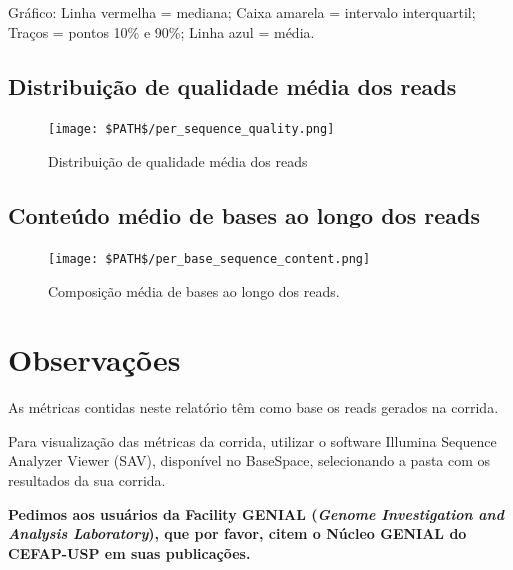 \documentclass[a4paper]{article}
\begin{document}
Gráfico:
Linha vermelha = mediana;
Caixa amarela = intervalo interquartil;
Traços = pontos 10\% e 90\%;
Linha azul = média.

\subsection*{Distribuição de qualidade média dos reads}

\begin{figure}[!htbp]
\centering
\texttt{[image: \$PATH\$/per\_sequence\_quality.png]}
\caption{Distribuição de qualidade média dos reads}
\label{FigQualidadeMediaReads}
\end{figure}

\pagebreak

\subsection*{Conteúdo médio de bases ao longo dos reads}

\begin{figure}[!htbp]
\centering
\texttt{[image: \$PATH\$/per\_base\_sequence\_content.png]}
\caption{Composição média de bases ao longo dos reads.}
\label{FigQualidadeMediaReads}
\end{figure}

\section*{Observações}

As métricas contidas neste relatório têm como base os reads gerados na corrida.

Para visualização das métricas da corrida, utilizar o software Illumina Sequence Analyzer Viewer (SAV), disponível no BaseSpace, selecionando a pasta com os resultados da sua corrida.

\bigskip
\textbf{Pedimos aos usuários da Facility GENIAL (\textit{Genome Investigation and Analysis Laboratory}), que por favor, citem o
Núcleo GENIAL do CEFAP-USP em suas publicações.}
\end{document}
